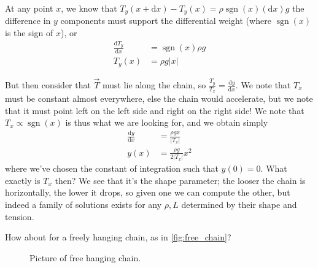 \documentclass[12pt]{report}
\newcommand{\rd}[2]{\frac{\mathrm{d}#1}{\mathrm{d}#2}}
\newcommand{\abs}[1]{\left|#1\right|}
\DeclareMathOperator{\sgn}{sgn}
\begin{document}
At any point $x$, we know that $T_y(x + \mathrm{d}x) - T_y(x) = \rho \sgn(x)
(\mathrm{d}x)g$ the difference in $y$ components must support the differential
weight (where $\sgn(x)$ is the sign of $x$), or
\begin{align*}
    \rd{T_y}{x} &= \sgn(x)\rho g\\
    T_y(x) &= \rho g \abs{x}
\end{align*}

But then consider that $\vec{T}$ must lie along the chain, so $\frac{T_y}{T_x} =
\rd{y}{x}$. We note that $T_x$ must be constant almost everywhere, else the
chain would accelerate, but we note that it must point left on the left side and
right on the right side! We note that $T_x \propto \sgn(x)$ is thus what we are
looking for, and we obtain simply
\begin{align}
    \rd{y}{x} &= \frac{\rho g x}{\abs{T_x}} \nonumber\\
    y(x) &= \frac{\rho g}{2\abs{T_x}}x^2\label{eq:bridge_curve}
\end{align}
where we've chosen the constant of integration such that $y(0) = 0$. What
exactly is $T_x$ then? We see that it's the shape parameter; the looser the
chain is horizontally, the lower it drops, so given one we can compute the
other, but indeed a family of solutions exists for any $\rho, L$ determined by
their shape and tension.

\hrulefill

How about for a freely hanging chain, as in \autoref{fig:free_chain}?
\begin{figure}[!h]
    \centering
    \caption{Picture of free hanging chain.\label{fig:free_chain}}
\end{figure}
\end{document}
